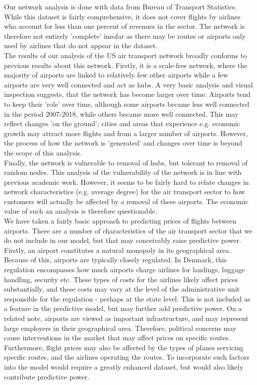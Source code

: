 \label{sec:results}
Our network analysis is done with data from Bureau of Transport Statistics. While this dataset is fairly comprehensive, it does not cover flights by airlines who account for less than one percent of revenues in the sector. The network is therefore not entirely 'complete' insofar as there may be routes or airports only used by airlines that do not appear in the dataset.\\
The results of our analysis of the US air transport network broadly conforms to previous results about this network. Firstly, it is a scale-free network, where the majority of airports are linked to relatively few other airports while a few airports are very well connected and act as hubs. A very basic analysis and visual inspection suggests, that the network has become larger over time. Airports tend to keep their 'role' over time, although some airports became less well connected in the period 2007-2018, while others became more well connected. This may reflect changes 'on the ground'; cities and areas that experience e.g. economic growth may attract more flights and from a larger number of airports. However, the process of how the network is 'generated' and changes over time is beyond the scope of this analysis. \\ Finally, the network is vulnerable to removal of hubs, but tolerant to removal of random nodes. This analysis of the vulnerability of the network is in line with previous academic work. However, it seems to be fairly hard to relate changes in network characteristics (e.g. average degree) for the air transport sector to how customers will actually be affected by a removal of these airports. The economic value of such an analysis is therefore questionable. \\

We have taken a fairly basic approach to predicting prices of flights between airports. There are a number of characteristics of the air transport sector that we do not include in our model, but that may conceivably raise predictive power. 
Firstly, an airport constitutes a natural monopoly in its geographical area. Because of this, airports are typically closely regulated. In Denmark, this regulation encompasses how much airports charge airlines for landings, luggage handling, security etc. These types of costs for the airlines likely affect prices substantially, and these costs may vary at the level of the administrative unit responsible for the regulation - perhaps at the state level. This is not included as a feature in the predictive model, but may further add predictive power. On a related note, airports are viewed as important infrastructure, and may represent large employers in their geographical area. Therefore, political concerns may cause interventions in the market that may affect prices on specific routes. Furthermore, flight prices may also be affected by the types of planes servicing specific routes, and the airlines operating the routes. To incorporate such factors into the model would require a greatly enhanced dataset, but would also likely contribute predictive power. \\
